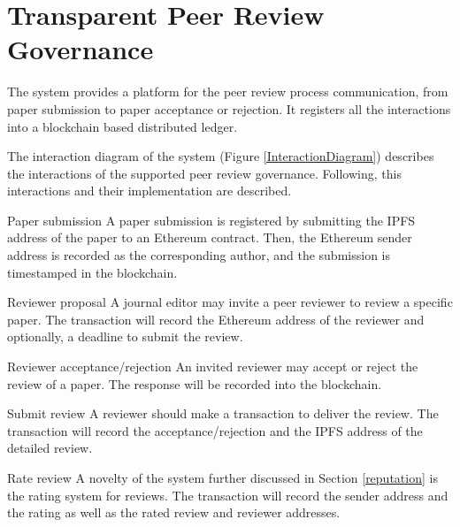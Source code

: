 

\section{Transparent Peer Review Governance}
\label{workflow}

The system provides a platform for the peer review process communication, from
paper submission to paper acceptance or rejection. It registers all the
interactions into a blockchain based distributed
ledger. %

The interaction diagram of the system (Figure \ref{InteractionDiagram})
describes the interactions of the supported peer review governance. Following,
this interactions and their implementation are described.


\begin{LaTeXdescription}
\item[Paper submission] A paper submission is registered by submitting the IPFS
  address of the paper to an Ethereum contract. Then, the Ethereum sender
  address is recorded as the corresponding author, and the submission is
  timestamped in the blockchain.

\item[Reviewer proposal] A journal editor may invite a peer reviewer to review a
  specific paper. The transaction will record the Ethereum address of the
  reviewer and optionally, a deadline to submit the review.

\item[Reviewer acceptance/rejection] An invited reviewer may accept or reject
  the review of a paper. The response will be recorded into the blockchain.

\item[Submit review] A reviewer should make a transaction to deliver the review.
  The transaction will record the acceptance/rejection and the IPFS address of
  the detailed review.

\item[Rate review] A novelty of the system further discussed in Section
  \ref{reputation} is the rating system for reviews. The transaction will record
  the sender address and the rating as well as the rated review and reviewer
  addresses.
\end{LaTeXdescription}

